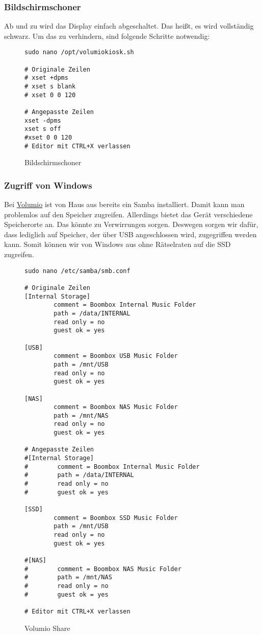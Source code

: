\documentclass[12pt,a4paper]{article}
\newcommand{\capla}[1]{\caption{#1}\label{fig:#1}}
\newcommand{\vol}{\href{https://volumio.org/}{Volumio}\index{Volumio}}
\begin{document}
\subsubsection{Bildschirmschoner}
Ab und zu wird das Display einfach abgeschaltet. Das heißt, es wird vollständig schwarz. Um das zu verhindern, sind folgende Schritte notwendig:

\begin{figure}[H]
\begin{lstlisting}
sudo nano /opt/volumiokiosk.sh

# Originale Zeilen
# xset +dpms
# xset s blank
# xset 0 0 120

# Angepasste Zeilen
xset -dpms
xset s off
#xset 0 0 120
# Editor mit CTRL+X verlassen
\end{lstlisting}
\capla{Bildschirmschoner}
\end{figure}

\subsubsection{Zugriff von Windows}
Bei \vol{} ist von Haus aus bereits ein Samba installiert. Damit kann man problemlos auf den Speicher zugreifen. Allerdings bietet das Gerät verschiedene
Speicherorte an. Das könnte zu Verwirrungen sorgen. Deswegen sorgen wir dafür, dass lediglich auf Speicher, der über USB angeschlossen wird, zugegriffen werden
kann. Somit können wir von Windows aus ohne Rätselraten auf die SSD zugreifen.

\begin{figure}[H]
\begin{lstlisting}
sudo nano /etc/samba/smb.conf

# Originale Zeilen
[Internal Storage]
        comment = Boombox Internal Music Folder
        path = /data/INTERNAL
        read only = no
        guest ok = yes

[USB]
        comment = Boombox USB Music Folder
        path = /mnt/USB
        read only = no
        guest ok = yes

[NAS]
        comment = Boombox NAS Music Folder
        path = /mnt/NAS
        read only = no
        guest ok = yes

# Angepasste Zeilen
#[Internal Storage]
#        comment = Boombox Internal Music Folder
#        path = /data/INTERNAL
#        read only = no
#        guest ok = yes

[SSD]
        comment = Boombox SSD Music Folder
        path = /mnt/USB
        read only = no
        guest ok = yes

#[NAS]
#        comment = Boombox NAS Music Folder
#        path = /mnt/NAS
#        read only = no
#        guest ok = yes

# Editor mit CTRL+X verlassen
\end{lstlisting}
\capla{Volumio Share}
\end{figure}
\end{document}
